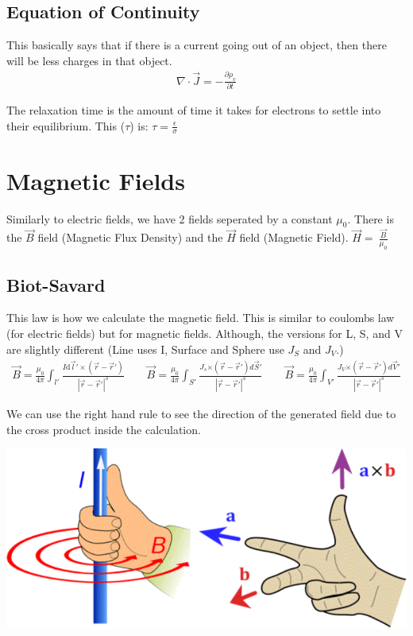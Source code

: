 \documentclass[12pt,letterpaper]{article} \usepackage{amsmath} \usepackage{graphicx} \usepackage[margin=1in]{geometry} \usepackage{longtable}  \usepackage{amssymb}
\begin{document}
	\subsection{Equation of Continuity}
	This basically says that if there is a current going out of an object, then there will be less charges in that object. 
	\begin{align*}
		\nabla \cdot \vec J = -\frac{\partial \rho_v}{\partial t}
	\end{align*}

	The relaxation time is the amount of time it takes for electrons to settle into their equilibrium. This ($\tau$) is: $\tau = \frac{\epsilon}{\sigma}$
	
	\section{Magnetic Fields}
	Similarly to electric fields, we have 2 fields seperated by a constant $\mu_0$. There is the $\vec B$ field (Magnetic Flux Density) and the $\vec H$ field (Magnetic Field). $\vec H = \ \frac{\vec B}{\mu_0}$
	
	\subsection{Biot-Savard}
	This law is how we calculate the magnetic field. This is similar to coulombs law (for electric fields) but for magnetic fields. Although, the versions for L, S, and V are slightly different (Line uses I, Surface and Sphere use $J_S$ and $J_V$.)
	\begin{align*}
		\vec B = \frac{\mu_0}{4\pi}\int_{l\prime}\frac{I\mathrm d \vec l\prime \times (\vec r - \vec r\prime)}{|\vec r - \vec r\prime |^3} \qquad \vec B = \frac{\mu_0}{4\pi}\int_{S\prime}\frac{J_s\mathrm \times (\vec r - \vec r\prime)d \vec S\prime}{|\vec r - \vec r\prime |^3} \qquad \vec B = \frac{\mu_0}{4\pi}\int_{V\prime}\frac{J_V\mathrm \times (\vec r - \vec r\prime)d \vec V\prime}{|\vec r - \vec r\prime |^3}
	\end{align*}

	We can use the right hand rule to see the direction of the generated field due to the cross product inside the calculation. 
	\begin{center}
		\includegraphics[width=0.7\linewidth]{rhr}
	\end{center}
\end{document}
